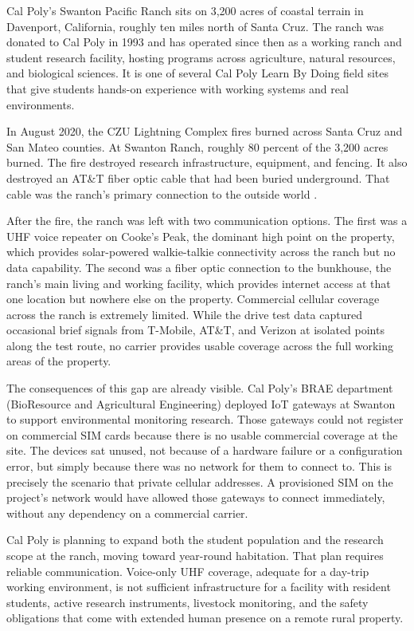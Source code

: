 \documentclass[
    left=1.5in,
    right=1.25in,
    top=1.25in,
    bottom=1.25in
]{CalPolySeniorProject}
\begin{document}
Cal Poly's Swanton Pacific Ranch sits on 3,200 acres of coastal terrain in
Davenport, California, roughly ten miles north of Santa Cruz. The ranch was
donated to Cal Poly in 1993 and has operated since then as a working ranch and
student research facility, hosting programs across agriculture, natural
resources, and biological sciences. It is one of several Cal Poly Learn By
Doing field sites that give students hands-on experience with working systems
and real environments.

In August 2020, the CZU Lightning Complex fires burned across Santa Cruz and
San Mateo counties. At Swanton Ranch, roughly 80 percent of the 3,200 acres
burned. The fire destroyed research infrastructure, equipment, and fencing. It
also destroyed an AT\&T fiber optic cable that had been buried underground. That
cable was the ranch's primary connection to the outside world
\autocite{hayes2020swanton}.

After the fire, the ranch was left with two communication options. The first
was a UHF voice repeater on Cooke's Peak, the dominant high point on the
property, which provides solar-powered walkie-talkie connectivity across the
ranch but no data capability. The second was a fiber optic connection to the
bunkhouse, the ranch's main living and working facility, which provides internet
access at that one location but nowhere else on the property. Commercial
cellular coverage across the ranch is extremely limited. While the drive test
data captured occasional brief signals from T-Mobile, AT\&T, and Verizon at
isolated points along the test route, no carrier provides usable coverage across
the full working areas of the property.

The consequences of this gap are already visible. Cal Poly's BRAE department
(BioResource and Agricultural Engineering) deployed IoT gateways at Swanton to
support environmental monitoring research. Those gateways could not register on
commercial SIM cards because there is no usable commercial coverage at the site.
The devices sat unused, not because of a hardware failure or a configuration
error, but simply because there was no network for them to connect to. This is
precisely the scenario that private cellular addresses. A provisioned SIM on the
project's network would have allowed those gateways to connect immediately,
without any dependency on a commercial carrier.

Cal Poly is planning to expand both the student population and the research
scope at the ranch, moving toward year-round habitation. That plan requires
reliable communication. Voice-only UHF coverage, adequate for a day-trip
working environment, is not sufficient infrastructure for a facility with
resident students, active research instruments, livestock monitoring, and the
safety obligations that come with extended human presence on a remote rural
property.
\end{document}
